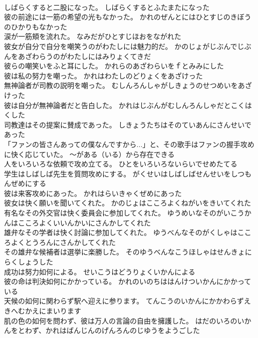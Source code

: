 \documentclass[8pt]{extreport}
\begin{document}
\begin{CJK}{UTF8}{min}
\\	しばらくすると二股になった。	しばらくするとふたまたになった 
\\	彼の前途には一筋の希望の光もなかった。	かれのぜんとにはひとすじのきぼうのひかりもなかった 
\\	涙が一筋頬を流れた。	なみだがひとすじほおをながれた 
\\	彼女が自分で自分を嘲笑うのがわたしには魅力的だ。	かのじょがじぶんでじぶんをあざわらうのがわたしにはみりょくてきだ 
\\	彼らの嘲笑いをふと耳にした。	かれらのあざわらいをｆとみみにした 
\\	彼は私の努力を嘲った。	かれはわたしのどりょくをあざけった 
\\	無神論者が司教の説明を嘲った。	むしんろんしゃがしきょうのせつめいをあざけった 
\\	彼は自分が無神論者だと告白した。	かれはじぶんがむしんろんしゃだとこくはくした 
\\	司教達はその提案に賛成であった。	しきょうたちはそのていあんにさんせいであった 
\\	「ファンの皆さんあっての僕なんですから...」と、その歌手はファンの握手攻めに快く応じていた。	～がある（いる）から存在できる
\\	人をいろいろな依頼で攻め立てる。	ひとをいろいろないらいでせめたてる 
\\	学生はしばしば先生を質問攻めにする。	がくせいはしばしばせんせいをしつもんぜめにする 
\\	彼は来客攻めにあった。	かれはらいきゃくぜめにあった 
\\	彼女は快く願いを聞いてくれた。	かのじょはこころよくねがいをきいてくれた 
\\	有名なその外交官は快く委員会に参加してくれた。	ゆうめいなそのがいこうかんはこころよくいいんかいにさんかしてくれた 
\\	雄弁なその学者は快く討論に参加してくれた。	ゆうべんなそのがくしゃはこころよくとうろんにさんかしてくれた 
\\	その雄弁な候補者は選挙に楽勝した。	そのゆうべんなこうほしゃはせんきょにらくしょうした 
\\	成功は努力如何による。	せいこうはどうりょくいかんによる 
\\	彼の命は判決如何にかかっている。	かれのいのちははんけついかんにかかっている 
\\	天候の如何に関わらず駅へ迎えに参ります。	てんこうのいかんにかかわらずえきへむかえにまいります 
\\	肌の色の如何を問わず、彼は万人の言論の自由を擁護した。	はだのいろのいかんをとわず、かれはばんじんのげんろんのじゆうをようごした 

\end{CJK}
\end{document}
